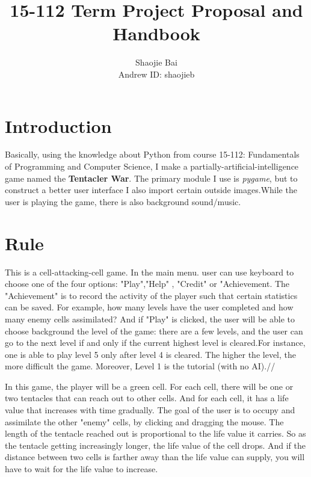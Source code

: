 \documentclass[12pt]{article}
\begin{document}
\title{15-112 Term Project Proposal and Handbook}
\author{Shaojie Bai \\ Andrew ID: shaojieb}


\maketitle


\section{Introduction}
Basically, using the knowledge about Python from course 15-112: Fundamentals of Programming and Computer Science, I make a partially-artificial-intelligence
game named the \textbf{Tentacler War}. The primary module I use is \textit{pygame}, but to construct a better user interface I also import certain outside images.While the user is playing 
the game, there is also background sound/music.

\section{Rule}
\indent This is a cell-attacking-cell game. In the main menu. user can use keyboard to choose one of the four options: "Play","Help" , "Credit" or "Achievement. The "Achievement" is to record the activity of the player such that certain statistics can be saved. For example, how many levels have the user completed and how many enemy cells assimilated?
And if "Play" is clicked, the user will be able to choose background the level of the game: there are a few levels, and the user can go to the next level if and only if the current highest level is cleared.For instance, one is able to play level 5 only after level 4 is cleared. The higher the level, the more difficult the game. Moreover, Level 1 is the tutorial (with no AI).//

\indent In this game, the player will be a green cell. For each cell, there will be one or two tentacles that can reach out to other cells. And for each cell, it has a life value that increases with time gradually. The goal of the user is to occupy and assimilate the other "enemy" cells, by clicking and dragging the mouse. The length of the tentacle reached out is proportional to the life value it
carries. So as the tentacle getting increasingly longer, the life value of the cell drops. And if the distance between two cells is farther away than the life value can supply, you will
have to wait for the life value to increase. \\
\end{document}
